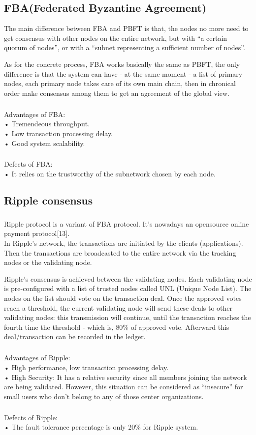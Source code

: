 \documentclass[doublespacing]{bmcart}
\begin{document}
\begin{CJK*}{UTF8}{gbsn}
	\subsection{FBA(Federated Byzantine Agreement)}
	 
	The main difference between FBA and PBFT is that, the nodes no more need to get consensus with other nodes on the entire network, but with ``a certain quorum of nodes'', or with a ``subnet representing a sufficient number of nodes''.
	
	 
	As for the concrete process, FBA works basically the same as PBFT, the only difference is that the system can have - at the same moment - a list of primary nodes, each primary node takes care of its own main chain, then in chronical order make consensus among them to get an agreement of the global view.
	
	\subparagraph{} 
Advantages of FBA:
\\• Tremendeous throughput.
\\• Low transaction processing delay.
\\• Good system scalability.
	\subparagraph{} 
Defects of FBA:	
\\• It relies on the trustworthy of the subnetwork chosen by each node.
	
	\subsection{Ripple consensus}
	\subparagraph{}  
	Ripple protocol is a variant of FBA protocol. It's nowadays an opensource online payment protocol[13].
	\\
	In Ripple's network, the transactions are initiated by the clients (applications). Then the transactions are broadcasted to the entire network via the tracking nodes or the validating node.

Ripple's consensus is achieved between the validating nodes. Each validating node is pre-configured with a list of trusted nodes called UNL (Unique Node List). The nodes on the list should vote on the transaction deal. Once the approved votes reach a threshold, the current validating node will send these deals to other validating nodes: this transmission will continue, until the transaction reaches the fourth time the threshold - which is, 80\% of approved vote. Afterward this deal/transaction can be recorded in the ledger.
	
	\subparagraph{} 
Advantages of Ripple:
\\• High performance, low transaction processing delay.
\\• High Security: It has a relative security since all members joining the network are being validated. However, this situation can be considered as ``insecure'' for small users who don't belong to any of those center organizations.
	\subparagraph{} 
Defects of Ripple:	
\\• The fault tolerance percentage is only 20\% for Ripple system.


\end{CJK*}
\end{document}
